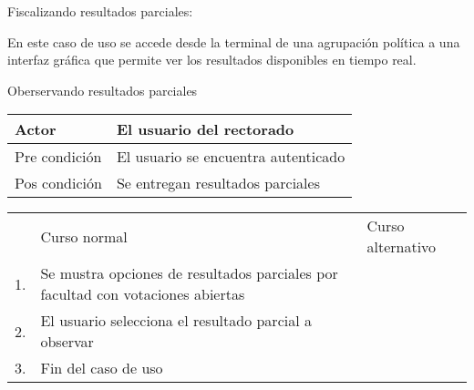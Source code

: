 \bigskip

Fiscalizando resultados parciales:

En este caso de uso se accede desde la terminal de una agrupación política a una interfaz gráfica que permite ver los resultados disponibles en tiempo real.


\bigskip
Oberservando resultados parciales

\begin{tabular}{ll}
Actor & El usuario del rectorado \\
\hline
Pre condición & El usuario se encuentra autenticado \\
\hline
Pos condición & Se entregan resultados parciales \\
\hline
\end{tabular}


\begin{tabular}{c p{4cm}|p{4cm}}
 & Curso normal & Curso alternativo \\
 1. & Se mustra opciones de resultados parciales por facultad con votaciones abiertas &   \\
 2. & El usuario selecciona el resultado parcial a observar &   \\
 3. & Fin del caso de uso & \\
\end{tabular}













